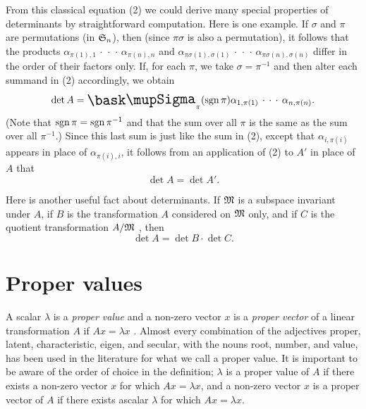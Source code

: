 From this classical equation (2) we could derive many special properties of
determinants by straightforward computation. Here is one example. If \(\sigma\)
and \(\pi\) are permutations (in \(\frak{S}_n\)), then (since \(\pi \sigma\) is
also a permutation), it follows that the products \(\alpha_{\pi(1),1}
\,\cdot\,\cdot\,\cdot\, \alpha_{\pi(n),n}\) and \(\alpha_{\pi\sigma(1),
\sigma(1)} \,\cdot\,\cdot\,\cdot\, \alpha_{\pi\sigma(n), \sigma(n)}\) differ in
the order of their factors only. If, for each \(\pi\), we take \(\sigma =
\pi^{-1}\) and then alter each summand in (2) accordingly, we obtain
\begin{equation*}
    \det A = \sumx_{\pi} (\sign \pi) \alpha_{1,\pi(1)} \,\cdot\,\cdot\,\cdot\, \alpha_{n,\pi(n)}.
\end{equation*}
(Note that \(\operatorname{sgn} \pi = \operatorname{sgn} \pi^{-1}\) and that the sum over all \(\pi\) is
the same as the sum over all \(\pi^{-1}\).) Since this last sum is just like the
sum in (2), except that \(\alpha_{i,\pi(i)}\) appears in place of
\(\alpha_{\pi(i),i}\), it follows from an application of (2) to \(A'\) in place
of \(A\) that
\begin{equation*}
    \det A = \det A'.
\end{equation*}

Here is another useful fact about determinants. If \(\frak{M}\) is a subspace
invariant under \(A\), if \(B\) is the transformation \(A\) considered on \(\frak{M}\) only, and if \(C\) is the quotient transformation \(A/\frak{M}\) , then
\begin{equation*}
    \det A = \det B \cdot \det C.
\end{equation*}

\section{Proper values}

A scalar \(\lambda\) is a \emph{proper value} and a non-zero vector \(x\) is a
\emph{proper vector} of a linear transformation \(A\) if \(Ax = \lambda x\) .
Almost every combination of the adjectives proper, latent, characteristic,
eigen, and secular, with the nouns root, number, and value, has been used in the
literature for what we call a proper value. It is important to be aware of the
order of choice in the definition; \(\lambda\) is a proper value of \(A\) if
there exists a non-zero vector \(x\) for which \(Ax = \lambda x\), and a
non-zero vector \(x\) is a proper vector of \(A\) if there exists ascalar
\(\lambda\) for which \(Ax = \lambda x\).


